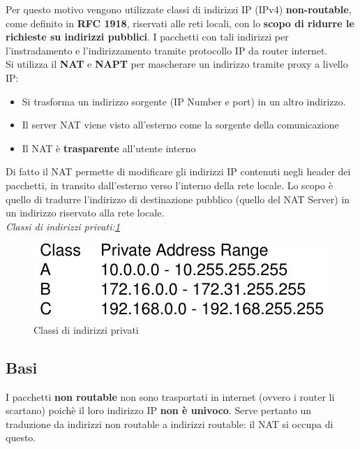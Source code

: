 \documentclass[12pt]{article}
\begin{document}
		Per questo motivo vengono utilizzate classi di indirizzi IP (IPv4) \textbf{non-routable}, come definito in \textbf{RFC 1918}, riservati alle reti locali, con lo \textbf{scopo di ridurre le richieste su indirizzi pubblici}. I pacchetti con tali indirizzi per l'instradamento e l'indirizzamento tramite protocollo IP da router internet.\\
		Si utilizza il \textbf{NAT} e \textbf{NAPT} per mascherare un indirizzo tramite proxy a livello IP:
		\begin{itemize}
			\item Si trasforma un indirizzo sorgente (IP Number e port) in un altro indirizzo.
			\item Il server NAT viene visto all'esterno come la sorgente della comunicazione
			\item Il NAT è \textbf{trasparente} all'utente interno 
		\end{itemize}
		Di fatto il NAT permette di modificare gli indirizzi IP contenuti negli header dei pacchetti, in transito dall'esterno verso l'interno della rete locale. Lo scopo è quello di tradurre l'indirizzo di destinazione pubblico (quello del NAT Server) in un indirizzo riservato  alla rete locale.\\
		
		\textit{Classi di indirizzi privati:\ref{fig:1}}
		\begin{figure}[h!]
			\centering
			\includegraphics[scale=0.40]{img/class.PNG}
			\caption{Classi di indirizzi privati\label{fig:1}}
		\end{figure}
		\subsection{Basi}
			I pacchetti \textbf{non routable} non sono trasportati in internet (ovvero i router li scartano) poichè il loro indirizzo IP \textbf{non è univoco}. Serve pertanto un traduzione da indirizzi non routable a indirizzi routable: il NAT si occupa di questo.\\
		
\end{document}
